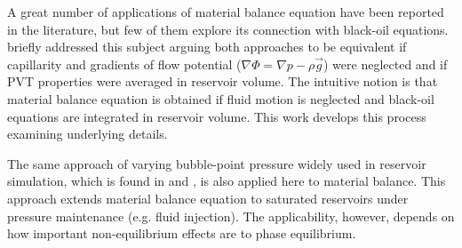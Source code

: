\documentclass[final,authoryear,5p,times,twocolumn,10pt]{elsarticle}
\begin{document}
A great number of applications of material balance equation have been reported in the literature, but few of them explore its connection with black-oil equations. \cite{ertekin2001basic} briefly addressed this subject arguing both approaches to be equivalent if capillarity and gradients of flow potential ($\nabla \Phi = \nabla p - \rho \vec{g}$) were neglected and if PVT properties were averaged in reservoir volume. The intuitive notion is that material balance equation is obtained if fluid motion is neglected and black-oil equations are integrated in reservoir volume. This work develops this process examining underlying details.





The same approach of varying bubble-point pressure widely used in reservoir simulation, which is found in \cite{aziz1979petroleum} and \cite{ertekin2001basic}, is also applied here to material balance. This approach extends material balance equation to saturated reservoirs under pressure maintenance (e.g. fluid injection). The applicability, however, depends on how important non-equilibrium effects are to phase equilibrium.
\end{document}
